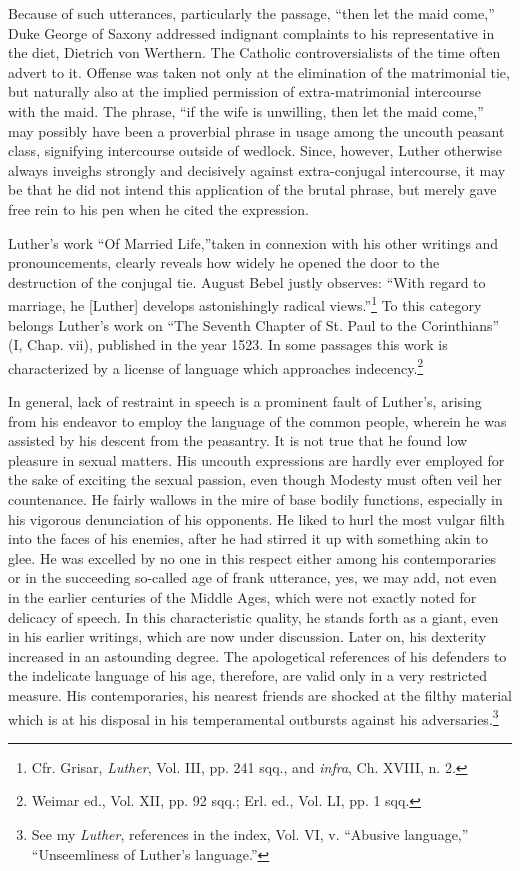 Because of such utterances, particularly the passage, ``then let the maid
come,'' Duke George of Saxony addressed indignant complaints to his representative
in the diet, Dietrich von Werthern. The Catholic controversialists of
the time often advert to it. Offense was taken not only at the elimination
of the matrimonial tie, but naturally also at the implied permission of
extra-matrimonial intercourse with the maid. The phrase, ``if the wife
is unwilling, then let the maid come,'' may possibly have been a proverbial
phrase in usage among the uncouth peasant class, signifying intercourse
outside of wedlock. Since, however, Luther otherwise always inveighs strongly
and decisively against extra-conjugal intercourse, it may be that he did
not intend this application of the brutal phrase, but merely gave free
rein to his pen when he cited the expression.

Luther's work ``Of Married Life,''taken in connexion with his other writings
and pronouncements, clearly reveals how widely he opened the door to the
destruction of the conjugal tie. August Bebel justly observes: ``With regard
to marriage, he [Luther] develops astonishingly radical views.''\footnote
{Cfr. Grisar, \textit{Luther}, Vol. III, pp. 241 sqq., and \textit{infra}, Ch. XVIII, n. 2.}
To this category belongs Luther's work on ``The Seventh Chapter of St. Paul
to the Corinthians'' (I, Chap. vii), published in the year 1523. In some
passages this work is characterized by a license of language which approaches
indecency.\footnote{Weimar ed., Vol. XII, pp. 92 sqq.; Erl. ed., Vol. LI, pp. 1 sqq.}

In general, lack of restraint in speech is a prominent fault
of Luther's, arising from his endeavor to employ the language of the common
people, wherein he was assisted by his descent from the peasantry. It
is not true that he found low pleasure in sexual matters. His uncouth
expressions are hardly ever employed for the sake of exciting the sexual
passion, even though Modesty must often veil her countenance. He fairly
wallows in the mire of base bodily
functions, especially in his vigorous denunciation of his opponents.
He liked to hurl the most vulgar filth into the faces of his enemies,
after he had stirred it up with something akin to glee. He was excelled
by no one in this respect either among his contemporaries
or in the succeeding so-called age of frank utterance, yes, we may
add, not even in the earlier centuries of the Middle Ages, which
were not exactly noted for delicacy of speech. In this characteristic
quality, he stands forth as a giant, even in his earlier writings, which
are now under discussion. Later on, his dexterity increased in an
astounding degree. The apologetical references of his defenders to
the indelicate language of his age, therefore, are valid only in a
very restricted measure. His contemporaries, his nearest friends
are shocked at the filthy material which is at his disposal in his temperamental
outbursts against his adversaries.\footnote
{See my \textit{Luther}, references in the index, Vol. VI, v. ``Abusive language,'' ``Unseemliness
of Luther's language.'' }


